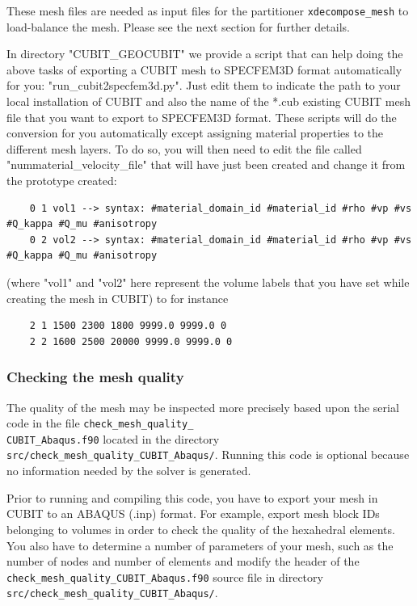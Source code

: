 These mesh files are needed as input files for the partitioner \texttt{xdecompose\_mesh}
to load-balance the mesh. Please see the next section for further
details.

In directory "CUBIT\_GEOCUBIT" we provide a script that can help doing the above tasks of exporting a CUBIT mesh
to SPECFEM3D format automatically for you: "run\_cubit2specfem3d.py".
Just edit them to indicate the path to your local installation of CUBIT and also the name of the *.cub existing CUBIT mesh file
that you want to export to SPECFEM3D format. These scripts will do the conversion for you automatically except assigning material properties
to the different mesh layers. To do so, you will then need to edit the file
called "nummaterial\_velocity\_file" that will have just been created and change it from the prototype created:
{\small
\begin{verbatim}
    0 1 vol1 --> syntax: #material_domain_id #material_id #rho #vp #vs #Q_kappa #Q_mu #anisotropy
    0 2 vol2 --> syntax: #material_domain_id #material_id #rho #vp #vs #Q_kappa #Q_mu #anisotropy
\end{verbatim}
}
(where "vol1" and "vol2" here represent the volume labels that you have set while creating the mesh in CUBIT)
to for instance
{\small
\begin{verbatim}
    2 1 1500 2300 1800 9999.0 9999.0 0
    2 2 1600 2500 20000 9999.0 9999.0 0
\end{verbatim}
}

\subsubsection*{Checking the mesh quality}

The quality of the mesh may be inspected more precisely based upon
the serial code in the file \texttt{check\_mesh\_quality\_}~\\
 \texttt{CUBIT\_Abaqus.f90} located in the directory \texttt{src/check\_mesh\_quality\_CUBIT\_Abaqus/}.
Running this code is optional because no information needed by the
solver is generated.

Prior to running and compiling this code, you have to export your
mesh in CUBIT to an ABAQUS (.inp) format. For example, export mesh
block IDs belonging to volumes in order to check the quality of the
hexahedral elements. You also have to determine a number of parameters
of your mesh, such as the number of nodes and number of elements and
modify the header of the \texttt{check\_mesh\_quality\_CUBIT\_Abaqus.f90}
source file in directory \texttt{src/check\_mesh\_quality\_CUBIT\_Abaqus/}.

